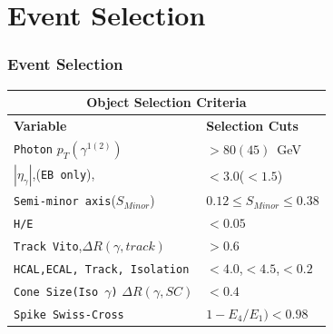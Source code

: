 \documentclass{beamer}
\begin{document}
\section{Event Selection}
\begin{frame}
\frametitle{\Huge Event Selection}
\begin{minipage}[b]{0.45\linewidth}
\centering
\small{
\begin{tabular}[2cm]{l l}
\multicolumn{2}{c}{\bfseries{Object Selection Criteria}} \\
  \hline 
  \bfseries{Variable} & \bfseries{Selection Cuts} \\
   \hline 
  \texttt{Photon} $p_{T}(\gamma^{1(2)})$  & $ > 80(45)$~GeV \\
 $|\eta_{\gamma}|$,(\texttt{EB only}),  &$ < 3.0$($ < 1.5$) \\
 \texttt{Semi-minor axis}($S_{Minor}$)  &$0.12 \leq S_{Minor} \leq 0.38$ \\
 \texttt{H/E}  & $ < 0.05$ \\
 \texttt{Track Vito},$\Delta R(\gamma, track)$  & $ > 0.6 $ \\
 \texttt{HCAL,ECAL, Track, Isolation}  & $ < 4.0 $,$ < 4.5 $,$ < 0.2 $ \\
 \texttt{Cone Size(Iso $\gamma$)} $\Delta R(\gamma, SC)$ & $< 0.4$ \\
 \texttt{Spike Swiss-Cross} & $1-E_{4}/E_{1})< 0.98$ \\ 


\end{tabular}}
\end{minipage}
\end{frame}
\end{document}
